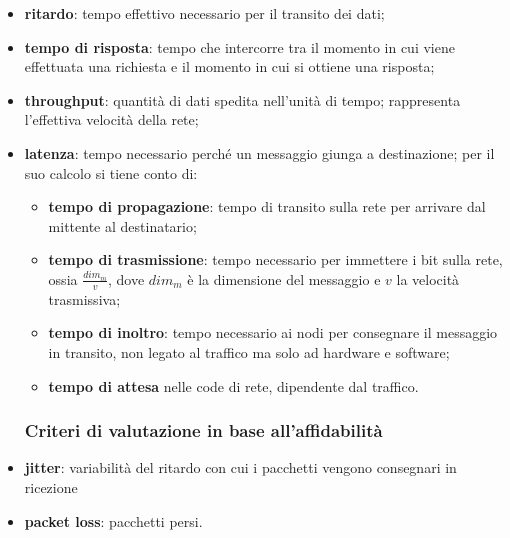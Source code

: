 \documentclass[a4paper,11pt]{article}
\begin{document}
\begin{itemize}
\item \textbf{ritardo}: tempo effettivo necessario per il transito dei dati;
\item \textbf{tempo di risposta}: tempo che intercorre tra il momento in cui viene effettuata una richiesta e il momento in cui si ottiene una risposta;
\item \textbf{throughput}: quantità di dati spedita nell'unità di tempo; rappresenta l'effettiva velocità della rete;
\item \textbf{latenza}: tempo necessario perché un messaggio giunga a destinazione; per il suo calcolo si tiene conto di:
\begin{itemize}
\item \textbf{tempo di propagazione}: tempo di transito sulla rete per arrivare dal mittente al destinatario;
\item \textbf{tempo di trasmissione}: tempo necessario per immettere i bit sulla rete, ossia $\frac{dim_{m}}{v}$, dove $dim_{m}$ è la dimensione del messaggio e $v$ la velocità trasmissiva;
\item \textbf{tempo di inoltro}: tempo necessario ai nodi per consegnare il messaggio in transito, non legato al traffico ma solo ad hardware e software;
\item \textbf{tempo di attesa} nelle code di rete, dipendente dal traffico.
\end{itemize}
\subsubsection{Criteri di valutazione in base all'affidabilità}
\item \textbf{jitter}: variabilità del ritardo con cui i pacchetti vengono consegnari in ricezione
\item \textbf{packet loss}: pacchetti persi.
\end{itemize}
\end{document}
